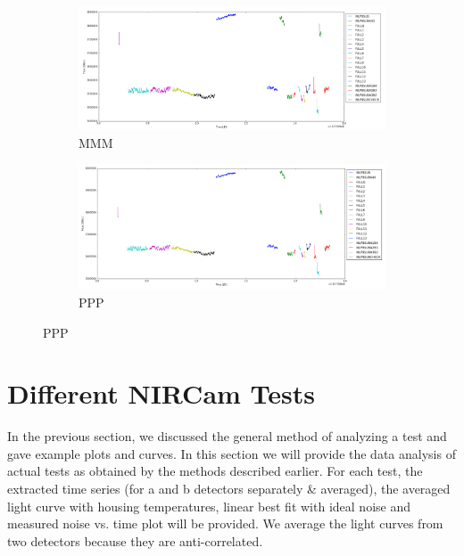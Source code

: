 \documentclass[conference]{IEEEtran}
\begin{document}
\begin{figure}[H]
    \centering
    \begin{subfigure}{1}
        \includegraphics[scale = 0.3]{MMM}
        \caption{MMM}
    \end{subfigure}

    \begin{subfigure}{2}
        \includegraphics[scale=0.3]{PPP}
        \caption{PPP}
    \end{subfigure}
\end{figure}


\section{Different NIRCam Tests}
In the previous section, we discussed the general method of analyzing a test and gave example plots and curves. In this section we will provide the data analysis of actual tests as obtained by the methods described earlier. For each test, the extracted time series (for a and b detectors separately \& averaged), the averaged light curve with housing temperatures, linear best fit with ideal noise and measured noise vs. time plot will be provided. We average the light curves from two detectors because they are anti-correlated. 
\end{document}
